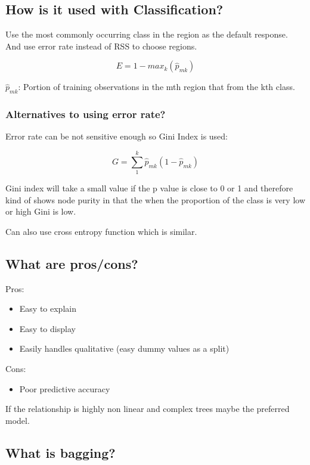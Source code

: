 \documentclass[11pt]{scrartcl} %
\begin{document}
\subsection{How is it used with Classification?}

Use the most commonly occurring class in the region as the default response. And use error rate
instead of RSS to choose regions.

\begin{equation}
	E = 1-max_k(\hat{p}_{mk})
\end{equation}

\(\hat{p}_{mk}\): Portion of training observations in the mth region that from the kth class.

\subsubsection{Alternatives to using error rate?}

Error rate can be not sensitive enough so Gini Index is used:

\begin{equation}
	G = \sum^k_1{\hat{p}_{mk}(1-\hat{p}_{mk})}
\end{equation}

Gini index will take a small value if the p value is close to 0 or 1 and therefore kind of shows
node purity in that the when the proportion of the class is very low or high Gini is low.

Can also use cross entropy function which is similar.

\subsection{What are pros/cons?}

Pros:
\begin{itemize}
	\item Easy to explain
	\item Easy to display
	\item Easily handles qualitative (easy dummy values as a split)
\end{itemize}

Cons:
\begin{itemize}
	\item Poor predictive accuracy
\end{itemize}

If the relationship is highly non linear and complex trees maybe the preferred model.

\subsection{What is bagging?}
\end{document}
